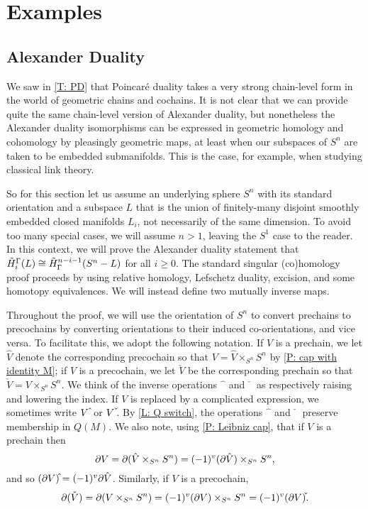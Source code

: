 
\section{Examples}\label{S: examples}

\subsection{Alexander Duality}


We saw in \cref{T: PD} that Poincar\'e duality takes a very strong chain-level form in the world of geometric chains and cochains.
It is not clear that we can provide quite the same chain-level version of Alexander duality, but nonetheless the Alexander duality isomorphisms can be expressed in geometric homology and cohomology by pleasingly geometric maps, at least when our subspaces of $S^n$ are taken to be embedded submanifolds.
This is the case, for example, when studying classical link theory.

So for this section let us assume an underlying sphere $S^n$ with its standard orientation and a subspace $L$ that is the union of finitely-many disjoint smoothly embedded closed manifolds $L_i$, not necessarily of the same dimension.
To avoid too many special cases, we will assume $n>1$, leaving the $S^1$ case to the reader.
In this context, we will prove the Alexander duality statement that $\tilde H_i^\Gamma(L) \cong \tilde H^{n-i-1}_\Gamma(S^n-L)$ for all $i \geq 0$.
The standard singular (co)homology proof proceeds by using relative homology, Lefschetz duality, excision, and some homotopy equivalences. We will instead define two mutually inverse maps.




Throughout the proof, we will use the orientation of $S^n$ to convert prechains to precochains by converting orientations to their induced co-orientations, and vice versa.
To facilitate this, we adopt the following notation.
If $V$ is a prechain, we let $\hat V$ denote the corresponding precochain so that $V = \hat V \times_{S^n} S^n$ by \cref{P: cap with identity M}; if $V$ is a precochain, we let $\check V$ be the corresponding prechain so that $\check V = V \times_{S^n} S^n$.
We think of the inverse operations $\hat{\phantom{a}}$ and $\check{\phantom{a}}$ as respectively raising and lowering the index.
If $V$ is replaced by a complicated expression, we sometimes write $V\,\hat{\vrule height1.3ex width0pt}$ or $V\,\check{\vrule height1.3ex width0pt}$.
By \cref{L: Q switch}, the operations $\hat{\phantom{a}}$ and $\check{\phantom{a}}$ preserve membership in $Q(M)$.
We also note, using \cref{P: Leibniz cap}, that if $V$ is a prechain then
$$\partial V = \partial(\hat V \times_{S^n} S^n) = (-1)^{v} (\partial \hat V) \times_{S^n} S^n,$$
and so $(\bd V)\hat{\vrule height1.3ex width0pt} = (-1)^{v} \bd \hat V$.
Similarly, if $V$ is a precochain, $$\bd(\check V) = \bd(V \times_{S^n} S^n) = (-1)^{v} (\bd V) \times_{S^n} S^n = (-1)^v (\bd V)\check{\vrule height1.3ex width0pt}.$$

